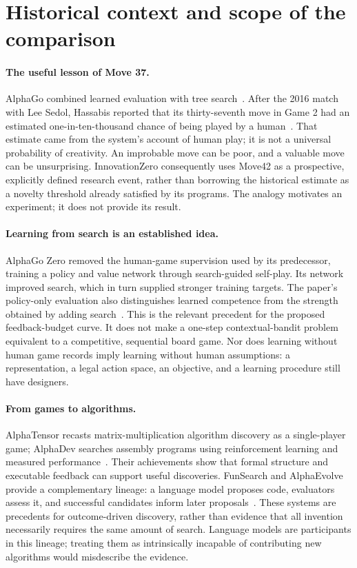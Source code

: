 \section{Historical context and scope of the comparison}
\label{app:context}

\paragraph{The useful lesson of Move 37.}
AlphaGo combined learned evaluation with tree search~\cite{alphago}.
After the 2016 match with Lee Sedol, Hassabis reported that its thirty-seventh
move in Game 2 had an estimated one-in-ten-thousand chance of being played by
a human~\cite{move37}. That estimate came from the system's account of human
play; it is not a universal probability of creativity. An improbable move can
be poor, and a valuable move can be unsurprising. InnovationZero consequently
uses Move42 as a prospective, explicitly defined research event, rather than
borrowing the historical estimate as a novelty threshold already satisfied by
its programs. The analogy motivates an experiment; it does not provide its
result.

\paragraph{Learning from search is an established idea.}
AlphaGo Zero removed the human-game supervision used by its predecessor,
training a policy and value network through search-guided self-play. Its
network improved search, which in turn supplied stronger training targets.
The paper's policy-only evaluation also distinguishes learned competence from
the strength obtained by adding search~\cite{alphagozero}. This is the relevant
precedent for the proposed feedback-budget curve. It does not make a
one-step contextual-bandit problem equivalent to a competitive, sequential
board game. Nor does learning without human game records imply learning
without human assumptions: a representation, a legal action space, an
objective, and a learning procedure still have designers.

\paragraph{From games to algorithms.}
AlphaTensor recasts matrix-multiplication algorithm discovery as a single-player
game; AlphaDev searches assembly programs using reinforcement learning and
measured performance~\cite{alphatensor,alphadev}. Their achievements show that
formal structure and executable feedback can support useful discoveries.
FunSearch and AlphaEvolve provide a complementary lineage: a language model
proposes code, evaluators assess it, and successful candidates inform later
proposals~\cite{funsearch,alphaevolve}. These systems are precedents for
outcome-driven discovery, rather than evidence that all invention necessarily
requires the same amount of search. Language models are participants in this
lineage; treating them as intrinsically incapable of contributing new
algorithms would misdescribe the evidence.

